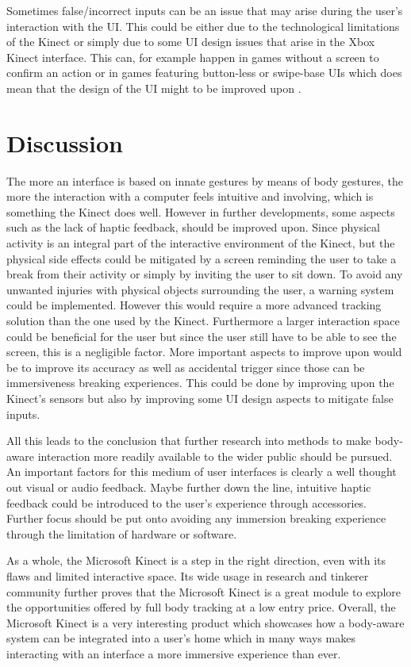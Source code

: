 \documentclass{sigchi}
\begin{document}
Sometimes false/incorrect inputs can be an issue that may arise during the user's interaction with the UI. This could be either due to the technological limitations of the Kinect or simply due to some UI design issues that arise in the Xbox Kinect interface. This can, for example happen in games without a screen to confirm an action or in games featuring button-less or swipe-base UIs which does mean that the design of the UI might to be improved upon \cite{Pirttiniemi2012}.

\section{Discussion}
The more an interface is based on innate gestures by means of body gestures, the more the interaction with a computer feels intuitive and involving, which is something the Kinect does well. However in further developments, some aspects such as the lack of haptic feedback, should be improved upon. Since physical activity is an integral part of the interactive environment of the Kinect, but the physical side effects could be mitigated by a screen reminding the user to take a break from their activity or simply by inviting the user to sit down. To avoid any unwanted injuries with physical objects surrounding the user, a warning system could be implemented. However this would require a more advanced tracking solution than the one used by the Kinect. Furthermore a larger interaction space could be beneficial for the user but since the user still have to be able to see the screen, this is a negligible factor. More important aspects to improve upon would be to improve its accuracy as well as accidental trigger since those can be immersiveness breaking experiences.  This could be done by improving upon the Kinect's sensors but also by improving some UI design aspects to mitigate false inputs. 

 All this leads to the conclusion that further research into methods to make body-aware interaction more readily available to the wider public should be pursued. An important factors for this medium of user interfaces is clearly a well thought out visual or audio feedback. Maybe further down the line, intuitive haptic feedback could be introduced to the user's experience through accessories. Further focus should be put onto avoiding any immersion breaking experience through the limitation of hardware or software.
 
 As a whole, the Microsoft Kinect is a step in the right direction, even with its flaws and limited interactive space. Its wide usage in research and tinkerer community further proves that the Microsoft Kinect is a great module to explore the opportunities offered by full body tracking at a low entry price.
Overall, the Microsoft Kinect is a very interesting product which showcases how a body-aware system can be integrated into a user's home which in many ways makes interacting with an interface a more immersive experience than ever.
\end{document}

